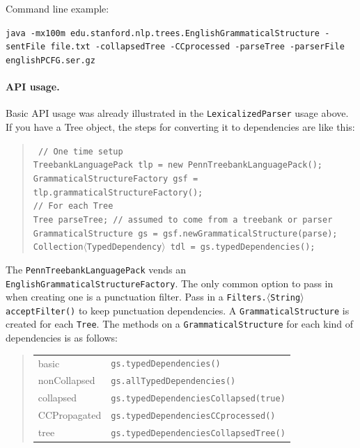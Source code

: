 \documentclass[11pt,letterpaper]{article}
\begin{document}
\bigskip

\noindent Command line example:\\
{\hangindent=0.5in\raggedright\texttt{java -mx100m edu.stanford.nlp.trees.EnglishGrammaticalStructure -sentFile file.txt -collapsedTree -CCprocessed -parseTree -parserFile englishPCFG.ser.gz}\\}

\paragraph{API usage.} Basic API usage was already
illustrated in the \texttt{LexicalizedParser} usage above.  If you
have a Tree object, the steps for converting it to dependencies are
like this:
\begin{quote}
\texttt{
// One time setup \\
TreebankLanguagePack tlp = new PennTreebankLanguagePack(); \\
GrammaticalStructureFactory gsf = tlp.grammaticalStructureFactory(); \\
// For each Tree \\
Tree parseTree; // assumed to come from a treebank or parser \\
GrammaticalStructure gs = gsf.newGrammaticalStructure(parse); \\
Collection$\langle$TypedDependency$\rangle$ tdl = gs.typedDependencies();
}
\end{quote}
The \texttt{PennTreebankLanguagePack} vends an
\texttt{EnglishGrammaticalStructureFactory}. The only common option
to pass in when creating one is a punctuation filter. Pass in a
\texttt{Filters.$\langle$String$\rangle$\discretionary{}{}{}acceptFilter()} to keep
punctuation dependencies. A \texttt{GrammaticalStructure} is created
for each \texttt{Tree}. The methods on a \texttt{GrammaticalStructure}
for each kind of dependencies is as follows:
\begin{quote}
\begin{tabular}{ll}
basic & \texttt{gs.typedDependencies()} \\
nonCollapsed & \texttt{gs.allTypedDependencies()} \\
collapsed & \texttt{gs.typedDependenciesCollapsed(true)} \\
CCPropagated & \texttt{gs.typedDependenciesCCprocessed()} \\
tree & \texttt{gs.typedDependenciesCollapsedTree()} \\
\end{tabular}
\end{quote}
\end{document}
